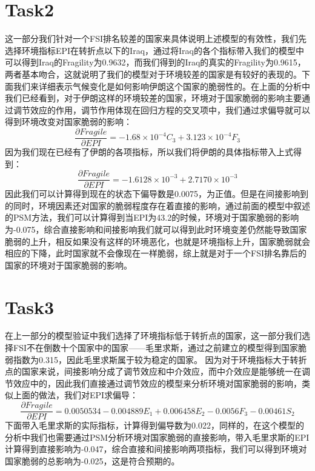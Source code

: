 {\section{Task2}
这一部分我们针对一个FSI排名较差的国家来具体说明上述模型的有效性，我们先选择环境指标EPI在转折点以下的Iraq，通过将Iraq的各个指标带入我们的模型中可以得到Iraq的Fragility为0.9632，而我们得到的Iraq的真实的Fragility为0.9615，两者基本吻合，这就说明了我们的模型对于环境较差的国家是有较好的表现的。下面我们来详细表示气候变化是如何影响伊朗这个国家的脆弱性的。在上面的分析中我们已经看到，对于伊朗这样的环境较差的国家，环境对于国家脆弱的影响主要通过调节效应的作用，调节作用体现在回归方程的交叉项中，我们通过求偏导就可以得到环境改变对国家脆弱的影响：
$$\frac{\partial{Fragile}}{\partial{EPI}} = -1.68 \times 10^{-4} C_3 + 3.123 \times 10^{-4}F_3$$
因为我们现在已经有了伊朗的各项指标，所以我们将伊朗的具体指标带入上式得到：
$$\frac{\partial{Fragile}}{\partial{EPI}} = -1.6128\times 10^{-3} +2.7170 \times 10^{-3}$$
因此我们可以计算得到现在的状态下偏导数是0.0075，为正值。但是在间接影响到的同时，环境因素还对国家的脆弱程度存在着直接的影响，通过前面的模型中叙述的PSM方法，我们可以计算得到当EPI为43.2的时候，环境对于国家脆弱的影响为-0.075，综合直接影响和间接影响我们就可以得到此时环境变差仍然能导致国家脆弱的上升，相反如果没有这样的环境恶化，也就是环境指标上升，国家脆弱就会相应的下降，此时国家就不会像现在一样脆弱，综上就是对于一个FSI排名靠后的国家的环境对于国家脆弱的影响。

\section{Task3}
在上一部分的模型验证中我们选择了环境指标低于转折点的国家，这一部分我们选择FSI不在倒数十个国家中的国家——毛里求斯，通过之前建立的模型得到国家脆弱指数为0.315，因此毛里求斯属于较为稳定的国家。
因为对于环境指标大于转折点的国家来说，间接影响分成了调节效应和中介效应，而中介效应是能够统一在调节效应中的，因此我们直接通过调节效应的模型来分析环境对国家脆弱的影响，类似上面的做法，我们对EPI求偏导：
$$\frac{\partial{Fragile}}{\partial{EPI}} = 0.0050534 - 0.004889E_1 +0.006458E_2 - 0.0056F_3 - 0.00461S_2$$
下面带入毛里求斯的实际指标，计算得到偏导数为0.022，同样的，在这个模型的分析中我们也需要通过PSM分析环境对国家脆弱的直接影响，带入毛里求斯的EPI计算得到直接影响为-0.047，综合直接和间接影响两项指标，我们可以得到环境对国家脆弱的总影响为-0.025，这是符合预期的。


}